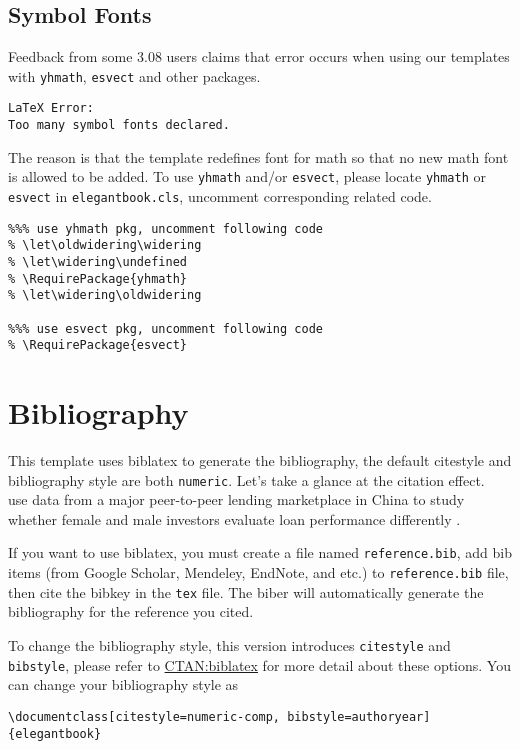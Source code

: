 \subsection{Symbol Fonts}
Feedback from some 3.08 users claims that error occurs when using our templates with  \lstinline{yhmath}, \lstinline{esvect} and other packages.
\begin{lstlisting}
LaTeX Error:
Too many symbol fonts declared.
\end{lstlisting}

The reason is that the template redefines font for math so that no new math font is allowed to be added. To use \lstinline{yhmath} and/or \lstinline{esvect}, please locate \lstinline{yhmath} or \lstinline{esvect} in \lstinline{elegantbook.cls}, uncomment corresponding related code.

\begin{lstlisting}
%%% use yhmath pkg, uncomment following code
% \let\oldwidering\widering
% \let\widering\undefined
% \RequirePackage{yhmath}
% \let\widering\oldwidering

%%% use esvect pkg, uncomment following code
% \RequirePackage{esvect}
\end{lstlisting}


\section{Bibliography}

This template uses biblatex to generate the bibliography, the default citestyle and bibliography style are both \lstinline{numeric}. Let's take a glance at the citation effect. ~\cite{en1} use data from a major peer-to-peer lending \cite{en3} marketplace in China to study whether female and male investors evaluate loan performance differently \parencite{en2}.

If you want to use biblatex, you must create a file named \lstinline{reference.bib}, add bib items (from Google Scholar, Mendeley, EndNote, and etc.) to \lstinline{reference.bib} file, then cite the bibkey in the \lstinline{tex} file. The biber will automatically generate the bibliography for the reference you cited.


To change the bibliography style, this version introduces \lstinline{citestyle} and \lstinline{bibstyle}, please refer to \href{https://ctan.org/pkg/biblatex}{CTAN:biblatex} for more detail about these options. You can change your bibliography style as
\begin{lstlisting}
\documentclass[citestyle=numeric-comp, bibstyle=authoryear]{elegantbook}
\end{lstlisting}


